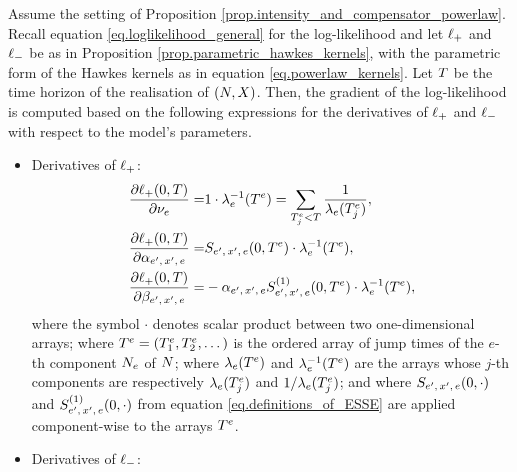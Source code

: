 \documentclass[10pt, article,table]{article}
\begin{document}
\begin{prop}\label{prop.derivatives_of_loglikelihood}
 Assume the setting of Proposition \ref{prop.intensity_and_compensator_powerlaw}. Recall equation \eqref{eq.loglikelihood_general} for the log-likelihood and let $\lplus$ and $\lminus$ be as in Proposition \ref{prop.parametric_hawkes_kernels}, with the parametric form of the Hawkes kernels as in equation \eqref{eq.powerlaw_kernels}. Let $\timeHorizon$ be the time horizon of the realisation of $(\multiCountingProc, \stateVariable)$. 
 Then, the gradient of the log-likelihood is computed based on the following expressions for the derivatives of $\lplus$ and $\lminus$ with respect to the model's parameters.
 \begin{itemize}
  \item Derivatives of $\lplus$:
  \begin{equation}\label{eq.derivatives_of_lplus}
  \begin{split}
   \frac{\partial\lplus(0,\timeHorizon)}{\partial\baseRate_e}
   =&
   1 \cdot \intensity[e]\inverse(\arrivalTimes[e])
   = \sum_{\arrivalTimes[e]_j < \timeHorizon}\frac{1}{\intensity[e](\arrivalTimes[e]_j)},
   \\
   \frac{\partial\lplus(0,\timeHorizon)}{\partial\impCoef\subscriptexe}
   =&
   \ESSE\subscriptexe(0,\arrivalTimes[e])\cdot \intensity[e]\inverse(\arrivalTimes[e]),
   \\
   \frac{\partial\lplus(0,\timeHorizon)}{\partial\decCoef\subscriptexe}
   =&
   -\impCoef\subscriptexe
   \ESSEone\subscriptexe(0,\arrivalTimes[e])\cdot \intensity[e]\inverse(\arrivalTimes[e]),
  \end{split}
 \end{equation}
 where the symbol $\cdot$ denotes scalar product between two one-dimensional arrays; where $\arrivalTimes[e] = (\arrivalTimes[e]_1, \arrivalTimes[e]_2, \dots )$ is the ordered array of jump times of the $e$-th component $\countingProc$ of $\multiCountingProc$;  where $\intensity[e](\arrivalTimes[e])$ and $\intensity[e]\inverse(\arrivalTimes[e])$ are the arrays whose $j$-th components are respectively $\intensity[e](\arrivalTimes[e]_j)$ and $1/\intensity[e](\arrivalTimes[e]_j)$; and where $\ESSE\subscriptexe(0,\cdot)$ and $\ESSEone\subscriptexe(0,\cdot)$ from equation \eqref{eq.definitions_of_ESSE} are applied component-wise to the arrays $\arrivalTimes[e]$.
 \item Derivatives of $\lminus$:
 \begin{equation}\label{eq.derivatives_of_lminus}
  \begin{split}

\end{split}
\end{equation}
\end{itemize}
\end{prop}
\end{document}
